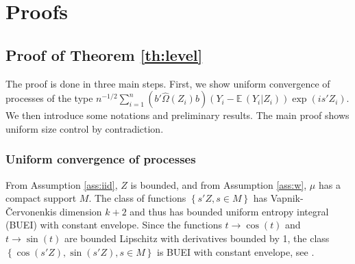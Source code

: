 \documentclass[12pt]{article}
\newcommand{\E}{\operatorname{E}}
\newcommand{\1}{\mathbf{1}}
\def\E{\mathbb{E}\,}
\def\Rit{\mathbb{R}}
\newcommand{\Real}{\Rit}
\begin{document}
\section{Proofs}
\label{sec:proofs}

\subsection{Proof of Theorem \ref{th:level}}

The proof is done in three main steps. First, we show uniform convergence
of processes of the type $n^{-1/2} \sum_{i=1}^{n}{\left(b'
\widehat{\Omega}(Z_i) b \right) \left( Y_{i} - \E(Y_{i}| Z_{i}
)\right) \exp(i s'Z_{i})}$. We then introduce some notations and
preliminary results.  The main proof  shows uniform size control by
contradiction.


\subsubsection{Uniform convergence of processes}
\label{sec:ucp}

From Assumption \ref{ass:iid}, $Z$ is bounded, and from Assumption \ref{ass:w}, $\mu$
has a compact support $M$.
The class of functions $\left\{ s'Z, s \in M \right\}$ has
Vapnik-\v{C}ervonenkis dimension $k+2$ and thus has bounded uniform
entropy integral (BUEI) with constant envelope.
Since the functions $t \rightarrow \cos(t)$ and $t \rightarrow
\sin(t)$ are bounded Lipschitz with
derivatives bounded by 1, the class $\left\{ \cos(s'Z), \sin(s'Z), s
\in M \right\}$ is BUEI with constant envelope, see \citet[Lemma 9.13]{kosorok}.
\end{document}
